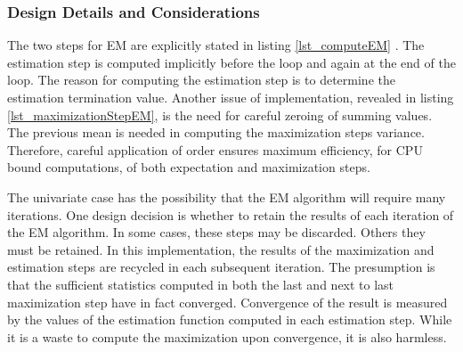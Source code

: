 \documentclass[11pt]{article}
\begin{document}
\subsubsection{Design Details and Considerations}
The two steps for EM are explicitly stated in listing \ref{lst_computeEM} .  %
The estimation step is computed implicitly%
before the loop and again at the end of the loop.  The reason for computing the estimation step is to determine the estimation termination value.    Another issue of implementation, revealed in listing \ref{lst_maximizationStepEM}, %
is the need for careful zeroing of summing values.  The previous mean is needed in computing the maximization steps variance.    Therefore, careful application of order ensures maximum efficiency, for CPU bound computations, of both expectation and maximization steps.  %


The univariate case has the possibility that the EM algorithm will require many iterations.  %
One design decision is whether to retain the results of each iteration of the EM algorithm.  In some cases, these steps may be discarded.  Others they must be retained.  In this implementation,  the results of the maximization and estimation steps are recycled in each subsequent iteration.  The presumption is that the sufficient statistics computed in both the last and next to last maximization step have in fact converged.  Convergence of the result is measured by the values of the estimation function computed in each estimation step.  While it is a waste to compute the maximization upon convergence, it is also harmless.  %
\end{document}
